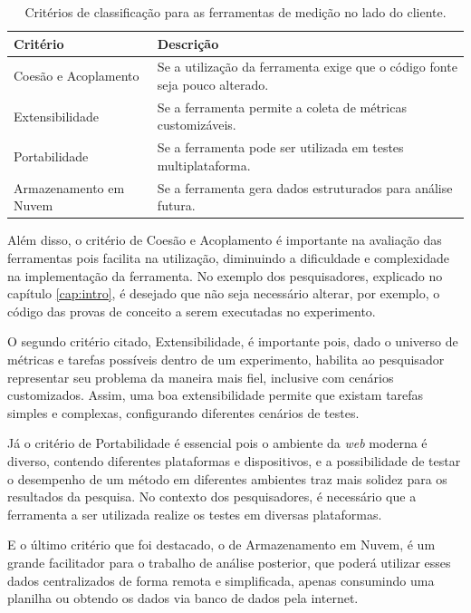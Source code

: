 \documentclass[12pt]{tcc}
\begin{document}
	\begin{table}[H]
		\centering
		\caption[Critérios para classificação das ferramentas encontradas]{Critérios de classificação para as ferramentas de medição no lado do cliente.}
		\begin{tabular}{lp{8.5cm}}
			\toprule
			\textbf{Critério} & \textbf{Descrição}\\
			\midrule 
			Coesão e Acoplamento & Se a utilização da ferramenta exige que o código fonte seja pouco alterado.\\
			Extensibilidade & Se a ferramenta permite a coleta de métricas customizáveis.\\
			Portabilidade & Se a ferramenta pode ser utilizada em testes multiplataforma.\\
			Armazenamento em Nuvem & Se a ferramenta gera dados estruturados para análise futura.\\
			\bottomrule
		\end{tabular}
		\label{tab:criterio-avaliacao-ferramentas}
	\end{table}

	Além disso, o critério de Coesão e Acoplamento é importante na avaliação das ferramentas pois facilita na utilização, diminuindo a dificuldade e complexidade na implementação da ferramenta. No exemplo dos pesquisadores, explicado no capítulo \ref{cap:intro}, é desejado que não seja necessário alterar, por exemplo, o código das provas de conceito a serem executadas no experimento. 
	
	O segundo critério citado, Extensibilidade, é importante pois, dado o universo de métricas e tarefas possíveis dentro de um experimento, habilita ao pesquisador representar seu problema da maneira mais fiel, inclusive com cenários customizados. Assim, uma boa extensibilidade permite que existam tarefas simples e complexas, configurando diferentes cenários de testes.
	
	Já o critério de Portabilidade é essencial pois o ambiente da \emph{web} moderna é diverso, contendo diferentes plataformas e dispositivos, e a possibilidade de testar o desempenho de um método em diferentes ambientes traz mais solidez para os resultados da pesquisa. No contexto dos pesquisadores, é necessário que a ferramenta a ser utilizada realize os testes em diversas plataformas.
	
	E o último critério que foi destacado, o de Armazenamento em Nuvem, é um grande facilitador para o trabalho de análise posterior, que poderá utilizar esses dados centralizados de forma remota e simplificada, apenas consumindo uma planilha ou obtendo os dados via banco de dados pela internet.
\end{document}
